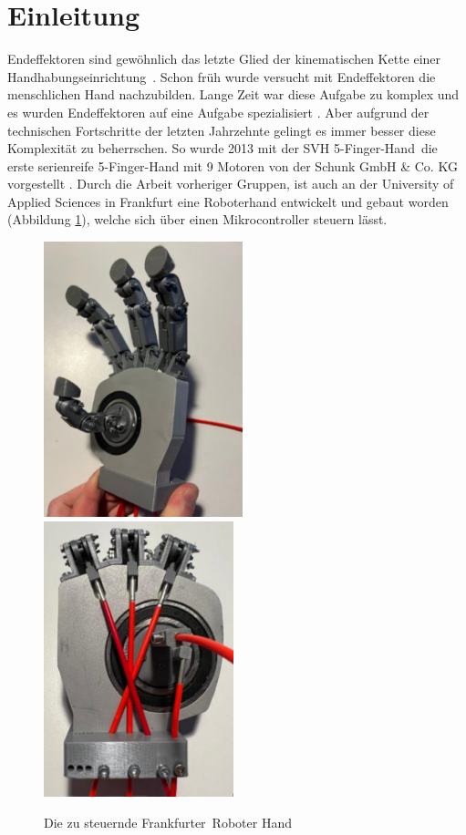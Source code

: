 \documentclass[a4paper,12pt,final]{article} %
\numberwithin{equation}{section} %
\numberwithin{figure}{section} %
\numberwithin{table}{section} %
\begin{document}
\section[Einleitung ]{Einleitung} 
Endeffektoren sind \glqq gewöhnlich das letzte Glied der kinematischen Kette einer Hand\-hab\-ungs\-ein\-richt\-ung\grqq\ \cite[S.302]{Hesse2013}. 
Schon früh wurde versucht mit Endeffektoren die men\-sch\-lich\-en Hand nachzubilden. Lange Zeit war diese Aufgabe zu komplex und es wurden Endeffektoren auf eine Aufgabe spezialisiert \cite[S.9]{VDI1990}.
Aber aufgrund der technischen Fortschritte der letzten Jahrzehnte gelingt es immer besser diese Komplexität zu be\-herr\-sch\-en.
So wurde 2013 mit der \glqq SVH 5-Finger-Hand\grqq\ die erste serienreife 5-Finger-Hand mit 9 Motoren von der Schunk GmbH \& Co. KG vorgestellt \cite[S.57]{Wolf2016}.
Durch die Arbeit vorheriger Gruppen, ist auch an der University of Applied Sciences in Frankfurt eine Roboterhand entwickelt und gebaut worden (Abbildung \ref{fig:RoboHand}), welche sich über einen Mikrocontroller steuern lässt.
\begin{figure}[H]
	\begin{center}
		\includegraphics[height=8cm]{Bilder/RoboHandVorne.png}
		\vspace{0.5cm}
		\includegraphics[height=8cm]{Bilder/RoboHandHinten.png}
		\caption{Die zu steuernde \glqq Frankfurter\grqq\ Roboter Hand}
		\label{fig:RoboHand}
	\end{center}
\end{figure}
\end{document}
